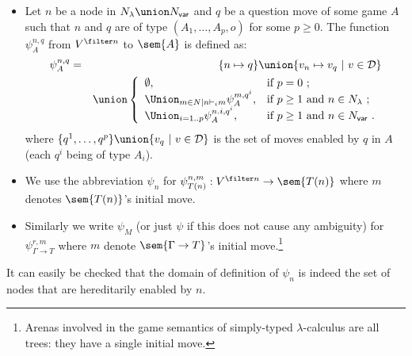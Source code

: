 \begin{definition}\hfill
\label{def:phi_psi mapping}

    \begin{itemize}[-]
    \item Let $n$ be a node in $N_\lambda \union N_{\sf var}$ and $q$ be a question move of some game $A$
such that $n$ and $q$ are of type $(A_1,\ldots,A_p,o)$ for some $p\geq 0$. The function $\psi^{n,q}_A$ from $V^{\filter n}$ to $\sem{A}$ is defined as:
        \begin{eqnarray*}
        \psi^{n,q}_A &=& \{ n \mapsto q \} \union  \{ v_n \mapsto v_q \ | \ v \in \mathcal{D} \}\\
         &&\union \left\{
                        \begin{array}{ll}
                          \emptyset, & \hbox{if $p=0$\ ;} \\
                          \Union_{m \in N | n \vdash_i m} \psi^{m, q^i}_A, & \hbox{if $p\geq1$ and $n\in N_{\lambda}$\ ;} \\
                          \Union_{i=1..p} \psi^{n.i, q^i}_A, & \hbox{if $p\geq1$ and $n\in N_{\sf var}$\ .}
                        \end{array}
                      \right.
        \end{eqnarray*}
        where $\{ q^1, \ldots, q^p \} \union \{ v_q \ | \ v \in \mathcal{D} \}$ is the set of moves enabled by $q$ in $A$ (each $q^i$ being of type $A_i$).

    \item We use the abbreviation $\psi_n$
    for $\psi^{n,m}_{T(n)} : V^{\filter n} \rightarrow \sem{T(n)}$
    where $m$ denotes $\sem{T(n)}$'s initial move.

    \item Similarly we write $\psi_M$ (or just $\psi$ if this does not cause any ambiguity)
    for $\psi^{r,m}_{\Gamma\rightarrow T}$ where $m$ denote $\sem{\Gamma\rightarrow T}$'s initial move.\footnote{Arenas involved in the game semantics of simply-typed $\lambda$-calculus are all trees: they have a single initial move.}
    \end{itemize}
\end{definition}

It can easily be checked that the domain of definition of $\psi_n$ is indeed the set of nodes that are hereditarily enabled by $n$.

